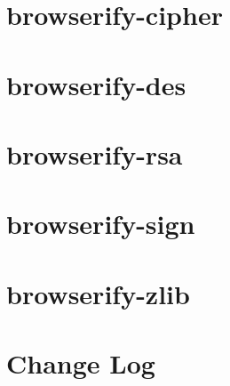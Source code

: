 \documentclass[twoside]{book}
\newcommand{\+}{\discretionary{\mbox{\scriptsize$\hookleftarrow$}}{}{}}
\begin{document}
\chapter{browserify-\/cipher}
\label{md__c_1_workspace_demo_src_main_script_node_modules_browserify-cipher_readme}

\chapter{browserify-\/des}
\label{md__c_1_workspace_demo_src_main_script_node_modules_browserify-des_readme}

\chapter{browserify-\/rsa}
\label{md__c_1_workspace_demo_src_main_script_node_modules_browserify-rsa_readme}

\chapter{browserify-\/sign}
\label{md__c_1_workspace_demo_src_main_script_node_modules_browserify-sign__r_e_a_d_m_e}

\chapter{browserify-\/zlib}
\label{md__c_1_workspace_demo_src_main_script_node_modules_browserify-zlib__r_e_a_d_m_e}

\chapter{Change Log}
\label{md__c_1_workspace_demo_src_main_script_node_modules_browserslist__c_h_a_n_g_e_l_o_g}

\end{document}
